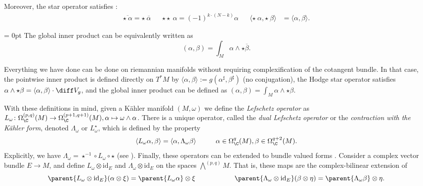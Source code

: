 Moreover, the star operator satisfies \parencite[Prop. 9.8]{lee_introCM}:
\begin{align*}
    \overline{\star \  \alpha} = \star \ \overline{\alpha} & &  \star \star \ \alpha  = (-1)^{k\cdot (N-k)} \alpha & & \langle \star \ \alpha, \star \ \beta \rangle & = \langle \alpha, \beta \rangle.
\end{align*}
{\parskip = 0pt
The global inner product can be equivalently written as
\begin{equation} \label{eq_Hodge_inner_prod_def_2}
    (\alpha, \beta)=\int_M \alpha \wedge \star \overline{\beta}. 
\end{equation}
\begin{obs}
    Everything we have done can be done on riemannian manifolds without requiring complexification of the cotangent bundle. In that case, the pointwise inner product is defined directly on \(T^*M\) by \(\langle\alpha, \beta\rangle:=g(\alpha^\sharp, \beta^\sharp)\) (no conjugation), the Hodge star operator satisfies \(\alpha \wedge \star \beta = \langle \alpha, \beta \rangle \cdot \diff V_g\), and the global inner product can be defined as \((\alpha, \beta)=\int_M \alpha \wedge \star \beta\).
\end{obs}

With these definitions in mind, given a Kähler manifold \((M, \omega)\) we define the \textit{Lefschetz operator} as \(L_\omega \colon \Omega_\C^{(p,q)}(M) \to \Omega_\C^{(p+1,q+1)}(M), \alpha \mapsto \omega \wedge \alpha\). There is a unique operator, called the \textit{dual Lefschetz operator} or the \textit{contraction with the Kähler form}, denoted \(\Lambda_\omega\) or \(L_\omega^\star\), which is defined by the property 
\[
\langle L_\omega \alpha, \beta \rangle  = \langle \alpha, \Lambda_\omega\beta \rangle  \hspace{1 cm} \alpha \in \Omega_\C^q(M), \beta \in \Omega_\C^{q+2}(M).
\]
Explicitly, we have \(\Lambda_\omega = \star^{-1} \circ L_\omega \circ \star\) (see \parencite[Lemma 1.2.23]{huybrechts2005complex}). Finally, these operators can be extended to bundle valued forms \parencite{huybrechts2005complex}. Consider a complex vector bundle \(E \to M\), and define \(L_\omega \otimes \mathrm{id}_E\) and \(\Lambda_\omega \otimes \mathrm{id}_E\) on the spaces \(\bigwedge^{(p,q)}M\). That is, these maps are the complex-bilinear extension of 
\[
\parent{L_\omega \otimes \mathrm{id}_E}(\alpha \otimes \xi) = \parent{L_\omega \alpha} \otimes \xi \hspace{2 cm} \parent{\Lambda_\omega \otimes \mathrm{id}_E}(\beta \otimes \eta) = \parent{\Lambda_\omega \beta} \otimes \eta.
\]

}
